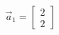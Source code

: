 \documentclass[preview]{standalone}
\begin{document}
\begin{align*}
\vec{a}_1=\begin{bmatrix} 2 \\ 2 \end{bmatrix}
\end{align*}
\end{document}
